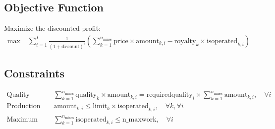 \documentclass{article}
\begin{document}
\subsection*{Objective Function}
Maximize the discounted profit:
\begin{align*}
\max \; & \sum_{i=1}^{I} \frac{1}{(1 + \text{discount})^i} \left( \sum_{k=1}^{n_{\text{mines}}} \text{price} \times \text{amount}_{k,i} - \text{royalty}_k \times \text{isoperated}_{k,i} \right)
\end{align*}

\subsection*{Constraints}
\begin{align*}
\text{Quality Constraint:} & \quad \sum_{k=1}^{n_{\text{mines}}} \text{quality}_k \times \text{amount}_{k,i} = \text{requiredquality}_i \times \sum_{k=1}^{n_{\text{mines}}} \text{amount}_{k,i}, \quad \forall i \\
\text{Production Limit:} & \quad \text{amount}_{k,i} \leq \text{limit}_k \times \text{isoperated}_{k,i}, \quad \forall k, \forall i \\
\text{Maximum Operating Mines:} & \quad \sum_{k=1}^{n_{\text{mines}}} \text{isoperated}_{k,i} \leq \text{n\_maxwork}, \quad \forall i \\
\end{align*}
\end{document}

